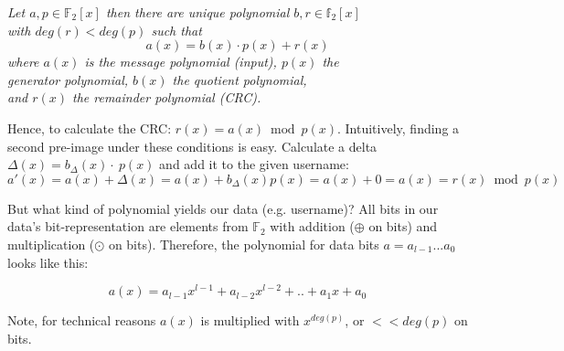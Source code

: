 \documentclass[10pt]{article}
\newcommand{\definition}[2]{
\begin{tcolorbox}[
		title={#1},hbox,
		colframe=green!75!black,
		colback=green!40!white,
		coltitle=black,
	]
    \begin{varwidth}{\textwidth}
		#2
    \end{varwidth}
\end{tcolorbox}
}
\begin{document}
\begin{center}
	\definition{CRC}{
	\textit{Let $a, p \in \mathds{F}_2[x]$ then there are unique polynomial $b, r \in \mathds{f}_2[x]$ \\ with $deg(r) < deg(p)$ such that}
	\begin{equation*}
		a(x) = b(x) \cdot p(x) + r(x)
	\end{equation*}
	\textit{where $a(x)$ is the message polynomial (input), $p(x)$ the \\ generator polynomial, $b(x)$ the quotient polynomial, \\ and $r(x)$ the remainder polynomial (CRC).}
	}
\end{center}

\vspace*{.4cm}
Hence, to calculate the CRC: $r(x) = a(x)\bmod p(x)$. Intuitively, finding a second pre-image under these conditions is easy. Calculate a delta $\Delta(x) = b_\Delta(x) \cdot\ p(x)$ and add it to the given username:
\begin{equation}
	a'(x) = a(x) + \Delta(x) = a(x) + b_\Delta(x)p(x) = a(x) + 0 = a(x) = r(x) \bmod p(x)
\end{equation}

But what kind of polynomial yields our data (e.g. username)? All bits in our data's bit-representation are elements from $\mathds{F}_2$ with addition ($\oplus$ on bits) and multiplication ($\odot$ on bits). Therefore, the polynomial for data bits $a=a_{l-1}...a_0$ looks like this:

\begin{equation}
	a(x) = a_{l-1}x^{l-1}+a_{l-2}x^{l-2}+..+a_1x+a_0
\end{equation}

\vspace*{.4cm}
Note, for technical reasons $a(x)$ is multiplied with $x^{deg(p)}$, or $<< deg(p)$ on bits. \\
\end{document}
